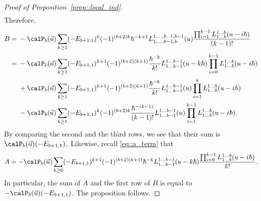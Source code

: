 \begin{proof}[Proof of Proposition~\ref{prop::local_ind}]
\begin{gather*}
		\end{gather*}
		Therefore,
		\begin{align*}
			B ={}&-\calP_{b}(\vec{u})\sum\limits_{k\geq 1} (-E_{b+1,1})^k (-1)^{(b+2)k} \hbar^{-k+1} L_{1,\dots,b-1,b}^{1,\dots,b-1,b+1}(u) \frac{\prod_{i=1}^{k-1} L_{1\dots b}^{1\dots b}(u-i\hbar)}{(k-1)!} \\
			={}&-\calP_{b}(\vec{u})\sum\limits_{k\geq 1} (-E_{b+1,1})^{k+1} (-1)^{(b+2)(k+1)} \frac{\hbar^{-k}}{k!} L_{1\dots b-1}^{1\dots b-1}(u-k\hbar) \prod_{i=0}^{k-1} L_{1\dots b}^{1\dots b}(u-i\hbar) \\
			&+ \calP_{b}(\vec{u})\sum\limits_{k\geq 1} (-E_{b+1,1})^{k+1} (-1)^{(b+2)(k+1)} \frac{\hbar^{-k}}{k!} L_{1\dots b-1}^{1\dots b-1}(u) \prod_{i=1}^{k} L_{1\dots b}^{1\dots b}(u-i\hbar) \\
			&- \calP_{b}(\vec{u})\sum\limits_{k\geq 1}(-E_{b+1,1})^k (-1)^{(b+2)k} \frac{\hbar^{-(k-1)}}{(k-1)!} L_{1\dots b-1}^{1\dots b-1}(u) \prod_{i=1}^{k-1} L_{1\dots b}^{1\dots b}(u-i\hbar).
		\end{align*}
		By comparing the second and the third rows, we see that their sum is $\calP_{b}(\vec{u})(-E_{b+1,1})$. Likewise, recall \eqref{eq::a_term} that
		\[
		A = -\calP_{b}(\vec{u}) \sum\limits_{k\geq 0} (-E_{b+1,1})^{k+1} (-1)^{(b+2)(k+1)} \hbar^{-k} L_{1\dots b-1}^{1\dots b-1}(u-k\hbar) \frac{\prod_{i=0}^{k-1} L_{1\dots b}^{1\dots b}(u-i\hbar)}{k!}.
		\]
		In particular, the sum of $A$ and the first row of $B$ is equal to $-\calP_{b}(\vec{u})(-E_{b+1,1})$. The proposition follows.
	\end{proof}
	

